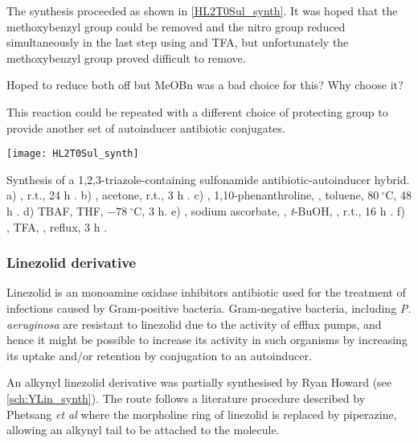 The synthesis proceeded as shown in \ref{HL2T0Sul_synth}. It was hoped that the methoxybenzyl group could be removed and the nitro group reduced simultaneously in the last step using  and TFA, but unfortunately the methoxybenzyl group proved difficult to remove.

Hoped to reduce both off but MeOBn was a bad choice for this?
Why choose it?

This reaction could be repeated with a different choice of protecting group to provide another set of autoinducer antibiotic conjugates.

\begin{scheme}[H]
	\begin{center}
		\texttt{[image: HL2T0Sul\_synth]}
		\caption{Synthesis of a 1,2,3-triazole-containing sulfonamide antibiotic-autoinducer hybrid.
		a) , r.t., 24 h \cite{Bendikov2005}. 
		b) , acetone, r.t., 3 h \cite{Graux2014}. 
		c) , 1,10-phenanthroline, , toluene, $80\ ^{\circ}$C, 48 h \cite{Graux2014}. 
		d) TBAF, THF, $-78\ ^{\circ}$C, 3 h\cite{Graux2014}. 
		e) , sodium ascorbate, , \textit{t}-BuOH, , r.t., 16 h \cite{IJsselstijn2006}. 
		f) , TFA, , reflux, 3 h \cite{Bissinger2011, Reuillon2012}.
		\label{sch:HL2T0Sul_synth}}
	\end{center}
\end{scheme}


\subsubsection{Linezolid derivative}

Linezolid is an  monoamine oxidase inhibitors antibiotic used for the treatment of infections caused by Gram-positive bacteria.
Gram-negative bacteria, including \textit{P. aeruginosa} are resistant to linezolid due to the activity of efflux pumps, and hence it might be possible to increase its activity in such organisms by increasing its uptake and/or retention by conjugation to an autoinducer.

An alkynyl linezolid derivative  was partially synthesised by Ryan Howard (see \ref{sch:YLin_synth}). The route follows a literature procedure described by Phetsang \textit{et al}\cite{Phetsang2014} where the morpholine ring of linezolid is replaced by piperazine, allowing an alkynyl tail to be attached to the molecule.

